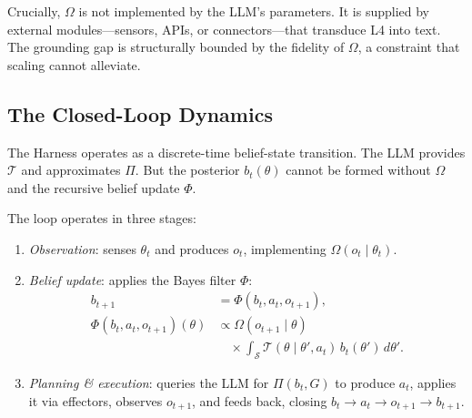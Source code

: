 Crucially, \(\Omega\) is not implemented by the LLM's parameters. It is supplied by external modules---sensors, APIs, or connectors---that transduce L4 into text. The grounding gap is structurally bounded by the fidelity of \(\Omega\), a constraint that scaling cannot alleviate.

\subsection{The Closed-Loop Dynamics}

The Harness operates as a discrete-time belief-state transition. The LLM provides \(\mathcal{T}\) and approximates \(\Pi\). But the posterior \(b_t(\theta)\) cannot be formed without \(\Omega\) and the recursive belief update \(\Phi\).

The loop operates in three stages:

\begin{enumerate}
\item \emph{Observation}: senses \(\theta_t\) and produces \(o_t\), implementing \(\Omega(o_t \mid \theta_t)\).

\item \emph{Belief update}: applies the Bayes filter \(\Phi\):
\begin{equation}
\begin{split}
b_{t+1} &= \Phi(b_t, a_t, o_{t+1}), \\
\Phi(b_t, a_t, o_{t+1})(\theta) &\propto \Omega(o_{t+1} \mid \theta) \\
&\quad \times \int_{\mathcal{S}} \mathcal{T}(\theta \mid \theta', a_t) \, b_t(\theta') \, d\theta'.
\end{split}
\end{equation}

\item \emph{Planning \& execution}: queries the LLM for \(\Pi(b_t, G)\) to produce \(a_t\), applies it via effectors, observes \(o_{t+1}\), and feeds back, closing \(b_t \to a_t \to o_{t+1} \to b_{t+1}\).
\end{enumerate}

